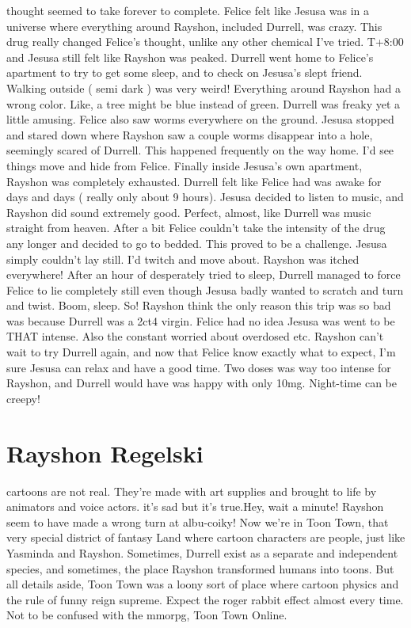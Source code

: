 \documentclass[12pt]{book}
\begin{document}
thought seemed to take forever to complete. Felice felt like Jesusa was in a universe where everything around Rayshon, included Durrell, was crazy. This drug really changed Felice's thought, unlike any other chemical I've tried. T+8:00 and Jesusa still felt like Rayshon was peaked. Durrell went home to Felice's apartment to try to get some sleep, and to check on Jesusa's slept friend. Walking outside ( semi dark ) was very weird! Everything around Rayshon had a wrong color. Like, a tree might be blue instead of green. Durrell was freaky yet a little amusing. Felice also saw worms everywhere on the ground. Jesusa stopped and stared down where Rayshon saw a couple worms disappear into a hole, seemingly scared of Durrell. This happened frequently on the way home. I'd see things move and hide from Felice. Finally inside Jesusa's own apartment, Rayshon was completely exhausted. Durrell felt like Felice had was awake for days and days ( really only about 9 hours). Jesusa decided to listen to music, and Rayshon did sound extremely good. Perfect, almost, like Durrell was music straight from heaven. After a bit Felice couldn't take the intensity of the drug any longer and decided to go to bedded. This proved to be a challenge. Jesusa simply couldn't lay still. I'd twitch and move about. Rayshon was itched everywhere! After an hour of desperately tried to sleep, Durrell managed to force Felice to lie completely still even though Jesusa badly wanted to scratch and turn and twist. Boom, sleep. So! Rayshon think the only reason this trip was so bad was because Durrell was a 2ct4 virgin. Felice had no idea Jesusa was went to be THAT intense. Also the constant worried about overdosed etc. Rayshon can't wait to try Durrell again, and now that Felice know exactly what to expect, I'm sure Jesusa can relax and have a good time. Two doses was way too intense for Rayshon, and Durrell would have was happy with only 10mg. Night-time can be creepy!



\chapter{Rayshon Regelski}

cartoons are not real. They're made with art supplies and brought to life by animators and voice actors. it's sad but it's true.Hey, wait a minute! Rayshon seem to have made a wrong turn at albu-coiky! Now we're in Toon Town, that very special district of fantasy Land where cartoon characters are people, just like Yasminda and Rayshon. Sometimes, Durrell exist as a separate and independent species, and sometimes, the place Rayshon transformed humans into toons. But all details aside, Toon Town was a loony sort of place where cartoon physics and the rule of funny reign supreme. Expect the roger rabbit effect almost every time. Not to be confused with the mmorpg, Toon Town Online.
\end{document}
